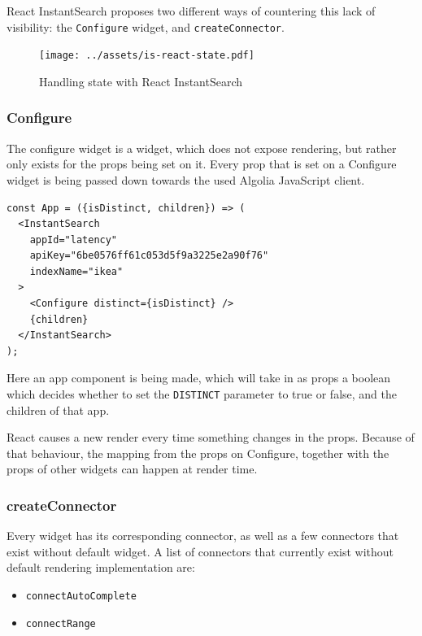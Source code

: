 React InstantSearch proposes two different ways of countering this lack of visibility: the {\tt Configure} widget, and {\tt createConnector}.

\begin{figure}[H]
\label{figure:is-react-state}
  \centering
  \texttt{[image: ../assets/is-react-state.pdf]}
  \caption{Handling state with React InstantSearch}
\end{figure}

\subsubsection{Configure}
\label{ssub:ris-configure}

The configure widget is a widget, which does not expose rendering, but rather only exists for the props being set on it. Every prop that is set on a Configure widget is being passed down towards the used Algolia JavaScript client.

\begin{lstlisting}[caption={Configure in an InstantSearch container},label={lst:ris-configure}]
const App = ({isDistinct, children}) => (
  <InstantSearch
    appId="latency"
    apiKey="6be0576ff61c053d5f9a3225e2a90f76"
    indexName="ikea"
  >
    <Configure distinct={isDistinct} />
    {children}
  </InstantSearch>
);
\end{lstlisting}

Here an app component is being made, which will take in as props a boolean which decides whether to set the {\tt DISTINCT} parameter to true or false, and the children of that app.

React causes a new render every time something changes in the props. Because of that behaviour, the mapping from the props on Configure, together with the props of other widgets can happen at render time.

\subsubsection{createConnector}
\label{ssub:ris-createconnector}

Every widget has its corresponding connector, as well as a few connectors that exist without default widget. A list of connectors that currently exist without default rendering implementation are:

\begin{itemize}
  \item {\tt connectAutoComplete}
  \item {\tt connectRange}
\end{itemize}

